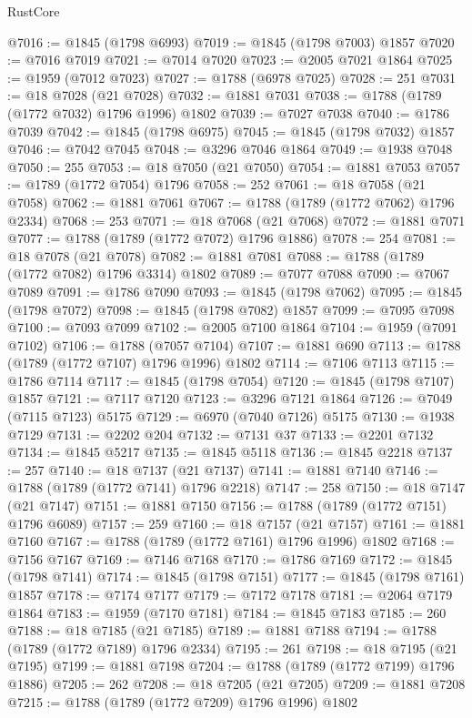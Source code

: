 \begin{lexlean}{RustCore}
\begin{coremodule}
@7016 := @1845 (@1798 @6993)
@7019 := @1845 (@1798 @7003) @1857
@7020 := @7016 @7019
@7021 := @7014 @7020
@7023 := @2005 @7021 @1864
@7025 := @1959 (@7012 @7023)
@7027 := @1788 (@6978 @7025)
@7028 := 251
@7031 := @18 @7028 (@21 @7028)
@7032 := @1881 @7031
@7038 := @1788 (@1789 (@1772 @7032) @1796 @1996) @1802
@7039 := @7027 @7038
@7040 := @1786 @7039
@7042 := @1845 (@1798 @6975)
@7045 := @1845 (@1798 @7032) @1857
@7046 := @7042 @7045
@7048 := @3296 @7046 @1864
@7049 := @1938 @7048
@7050 := 255
@7053 := @18 @7050 (@21 @7050)
@7054 := @1881 @7053
@7057 := @1789 (@1772 @7054) @1796
@7058 := 252
@7061 := @18 @7058 (@21 @7058)
@7062 := @1881 @7061
@7067 := @1788 (@1789 (@1772 @7062) @1796 @2334)
@7068 := 253
@7071 := @18 @7068 (@21 @7068)
@7072 := @1881 @7071
@7077 := @1788 (@1789 (@1772 @7072) @1796 @1886)
@7078 := 254
@7081 := @18 @7078 (@21 @7078)
@7082 := @1881 @7081
@7088 := @1788 (@1789 (@1772 @7082) @1796 @3314) @1802
@7089 := @7077 @7088
@7090 := @7067 @7089
@7091 := @1786 @7090
@7093 := @1845 (@1798 @7062)
@7095 := @1845 (@1798 @7072)
@7098 := @1845 (@1798 @7082) @1857
@7099 := @7095 @7098
@7100 := @7093 @7099
@7102 := @2005 @7100 @1864
@7104 := @1959 (@7091 @7102)
@7106 := @1788 (@7057 @7104)
@7107 := @1881 @690
@7113 := @1788 (@1789 (@1772 @7107) @1796 @1996) @1802
@7114 := @7106 @7113
@7115 := @1786 @7114
@7117 := @1845 (@1798 @7054)
@7120 := @1845 (@1798 @7107) @1857
@7121 := @7117 @7120
@7123 := @3296 @7121 @1864
@7126 := @7049 (@7115 @7123) @5175
@7129 := @6970 (@7040 @7126) @5175
@7130 := @1938 @7129
@7131 := @2202 @204
@7132 := @7131 @37
@7133 := @2201 @7132
@7134 := @1845 @5217
@7135 := @1845 @5118
@7136 := @1845 @2218
@7137 := 257
@7140 := @18 @7137 (@21 @7137)
@7141 := @1881 @7140
@7146 := @1788 (@1789 (@1772 @7141) @1796 @2218)
@7147 := 258
@7150 := @18 @7147 (@21 @7147)
@7151 := @1881 @7150
@7156 := @1788 (@1789 (@1772 @7151) @1796 @6089)
@7157 := 259
@7160 := @18 @7157 (@21 @7157)
@7161 := @1881 @7160
@7167 := @1788 (@1789 (@1772 @7161) @1796 @1996) @1802
@7168 := @7156 @7167
@7169 := @7146 @7168
@7170 := @1786 @7169
@7172 := @1845 (@1798 @7141)
@7174 := @1845 (@1798 @7151)
@7177 := @1845 (@1798 @7161) @1857
@7178 := @7174 @7177
@7179 := @7172 @7178
@7181 := @2064 @7179 @1864
@7183 := @1959 (@7170 @7181)
@7184 := @1845 @7183
@7185 := 260
@7188 := @18 @7185 (@21 @7185)
@7189 := @1881 @7188
@7194 := @1788 (@1789 (@1772 @7189) @1796 @2334)
@7195 := 261
@7198 := @18 @7195 (@21 @7195)
@7199 := @1881 @7198
@7204 := @1788 (@1789 (@1772 @7199) @1796 @1886)
@7205 := 262
@7208 := @18 @7205 (@21 @7205)
@7209 := @1881 @7208
@7215 := @1788 (@1789 (@1772 @7209) @1796 @1996) @1802

\end{coremodule}
\end{lexlean}
